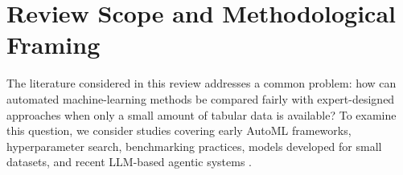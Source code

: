 \documentclass[acmsmall,screen]{acmart}
\begin{document}




\section{Review Scope and Methodological Framing}\label{sec:scope}



The literature considered in this review addresses a common problem: how can automated machine-learning methods be compared fairly with expert-designed approaches when only a small amount of tabular data is available? To examine this question, we consider studies covering early AutoML frameworks, hyperparameter search, benchmarking practices, models developed for small datasets, and recent LLM-based agentic systems \cite{hutter2011,feurer2015,olson2016,li2018,falkner2018,erickson2020,wang2021,gijsbers2024,hollmann2023,trirat2025}.
\end{document}

